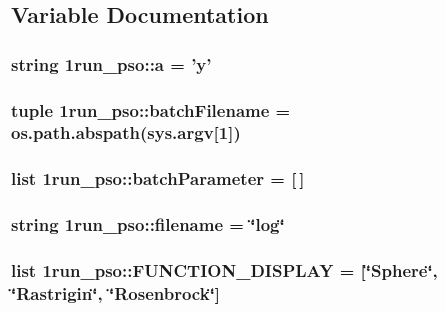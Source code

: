 \subsection{Variable Documentation}
\hypertarget{namespace1run__pso_5667fa615eba918b5eeacb60b34d416e}{
\subsubsection{\setlength{\rightskip}{0pt plus 5cm}string 1run\_\-pso::a = 'y'}}
\label{namespace1run__pso_5667fa615eba918b5eeacb60b34d416e}


\hypertarget{namespace1run__pso_479302628de9aa78f7c3e664d9ced3e9}{
\subsubsection{\setlength{\rightskip}{0pt plus 5cm}tuple 1run\_\-pso::batchFilename = os.path.abspath(sys.argv\mbox{[}1\mbox{]})}}
\label{namespace1run__pso_479302628de9aa78f7c3e664d9ced3e9}


\hypertarget{namespace1run__pso_720ec17ab043f3be0371a0042ee88001}{
\subsubsection{\setlength{\rightskip}{0pt plus 5cm}list 1run\_\-pso::batchParameter = \mbox{[}$\,$\mbox{]}}}
\label{namespace1run__pso_720ec17ab043f3be0371a0042ee88001}


\hypertarget{namespace1run__pso_2d967f08751a6276aa70648cf43e574f}{
\subsubsection{\setlength{\rightskip}{0pt plus 5cm}string 1run\_\-pso::filename = \char`\"{}log\char`\"{}}}
\label{namespace1run__pso_2d967f08751a6276aa70648cf43e574f}


\hypertarget{namespace1run__pso_2cd64d144b00d2fa5d33aef3f5dc5ba6}{
\subsubsection{\setlength{\rightskip}{0pt plus 5cm}list 1run\_\-pso::FUNCTION\_\-DISPLAY = \mbox{[}\char`\"{}Sphere\char`\"{}, \char`\"{}{\bf Rastrigin}\char`\"{}, \char`\"{}{\bf Rosenbrock}\char`\"{}\mbox{]}}}
\label{namespace1run__pso_2cd64d144b00d2fa5d33aef3f5dc5ba6}


